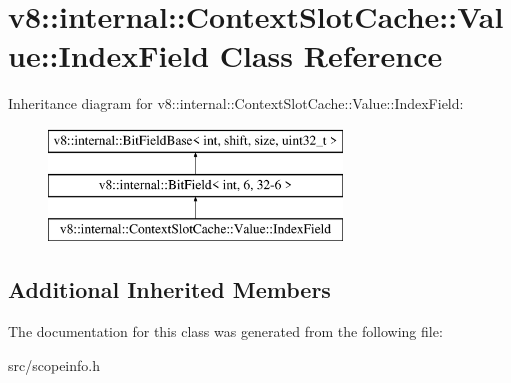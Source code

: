 \hypertarget{classv8_1_1internal_1_1_context_slot_cache_1_1_value_1_1_index_field}{}\section{v8\+:\+:internal\+:\+:Context\+Slot\+Cache\+:\+:Value\+:\+:Index\+Field Class Reference}
\label{classv8_1_1internal_1_1_context_slot_cache_1_1_value_1_1_index_field}
Inheritance diagram for v8\+:\+:internal\+:\+:Context\+Slot\+Cache\+:\+:Value\+:\+:Index\+Field\+:\begin{figure}[H]
\begin{center}
\leavevmode
\includegraphics[height=3.000000cm]{classv8_1_1internal_1_1_context_slot_cache_1_1_value_1_1_index_field}
\end{center}
\end{figure}
\subsection*{Additional Inherited Members}


The documentation for this class was generated from the following file\+:\begin{DoxyCompactItemize}
\item 
src/scopeinfo.\+h\end{DoxyCompactItemize}
